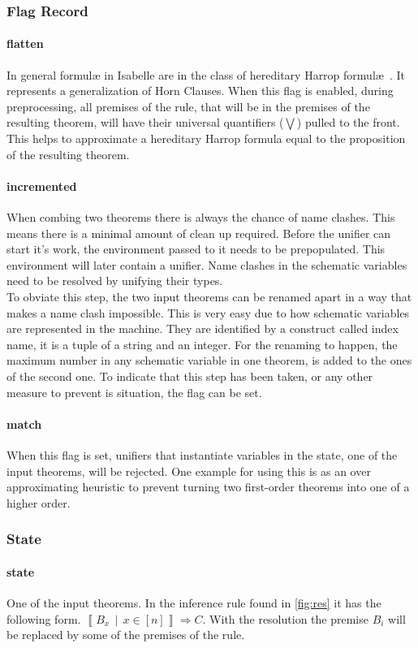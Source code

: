 \subsubsection{Flag Record}
\paragraph{flatten}
In general formul\ae {} in Isabelle are in the class of hereditary Harrop formul\ae~\parencite{implementation}. It represents a generalization of Horn Clauses. When this flag is enabled, during preprocessing, all premises of the rule, that will be in the premises of the resulting theorem, will have their universal quantifiers ($\bigvee$) pulled to the front. This helps to approximate a hereditary Harrop formula equal to the proposition of the resulting theorem.
\paragraph{incremented}
When combing two theorems there is always the chance of name clashes. This means there is a minimal amount of clean up required. Before the unifier can start it's work, the environment passed to it needs to be prepopulated. This environment will later contain a unifier. Name clashes in the schematic variables need to be resolved by unifying their types.\\
To obviate this step, the two input theorems can be renamed apart in a way that makes a name clash impossible. This is very easy due to how schematic variables are represented in the machine. They are identified by a construct called index name, it is a tuple of a string and an integer. For the renaming to happen, the maximum number in any schematic variable in one theorem, is added to the ones of the second one. To indicate that this step has been taken, or any other measure to prevent is situation, the flag can be set.
\paragraph{match}
When this flag is set, unifiers that instantiate variables in the state, one of the input theorems, will be rejected. One example for using this is as an over approximating heuristic to prevent turning two first-order theorems into one of a higher order.

\subsubsection{State}
\paragraph{state}
One of the input theorems. In the inference rule found in \ref{fig:res} it has the following form. $\left\llbracket B_x\,\middle|\, x \in \left[ n \right] \right\rrbracket \Longrightarrow C$. With the resolution the premise $B_i$ will be replaced by some of the premises of the rule.
